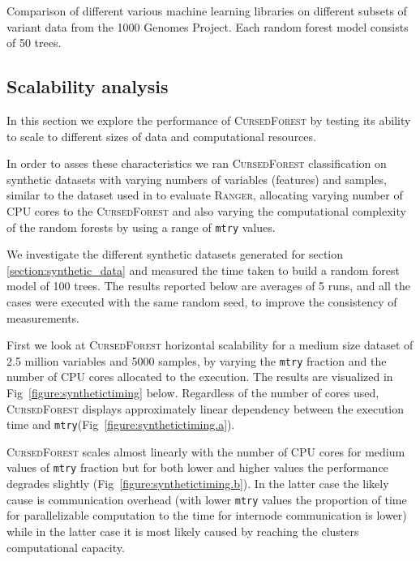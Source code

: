 \documentclass[10pt,letterpaper]{article}
\newcommand{\cursedforest}{\textsc{CursedForest}\xspace}
\newcommand{\ranger}{\textsc{Ranger}\xspace}
\newcommand{\mtry}{\texttt{mtry}\xspace}
\begin{document}
\begin{table}[!ht]
\begin{minipage}{\textwidth}
\begin{tabular}{| l | l | r | l |}
\end{tabular}
\begin{flushleft} 
Comparison of different various machine learning libraries on different subsets of variant data 
from the 1000 Genomes Project.
Each random forest model consists of 50 trees.
\end{flushleft}
\label{timingtable}
\end{minipage}
\end{table}

\fi


\subsection{Scalability analysis}
In this section we explore the performance of \cursedforest by testing its ability to scale to different sizes of data
and computational resources.

In order to asses these characteristics we ran \cursedforest classification on synthetic datasets with varying numbers
of variables (features) and samples, similar to the dataset used in \cite{Wright.and.Ziegle.2016} to evaluate
\ranger, allocating varying number of CPU cores to the \cursedforest and also varying the computational complexity
of the random forests by using a range of \mtry values.

We investigate the different synthetic datasets generated for section \ref{section:synthetic_data} and measured the time
taken to build a random forest model of 100 trees. The results reported below are averages of 5 runs, and all the cases
were executed with the same random seed, to improve the consistency of measurements.

First we look at \cursedforest horizontal scalability for a medium size dataset of 2.5 million variables and 5000
samples, by varying the \mtry  fraction and the number of CPU cores allocated to the execution. 
The results are  visualized in Fig~\ref{figure:synthetictiming} below. 
Regardless of the number of cores used, \cursedforest displays approximately linear dependency between the execution
time and \mtry (Fig~\ref{figure:synthetictiming.a}).

\cursedforest scales almost linearly with the number of CPU cores for medium values of \mtry fraction but for both
lower and higher values the performance degrades slightly (Fig~\ref{figure:synthetictiming.b}). In the latter case the likely cause is
communication overhead (with lower \mtry values the proportion of time for parallelizable computation to the time for
internode communication is lower) while in the latter case it is most likely caused by reaching the clusters
computational capacity.
\end{document}
